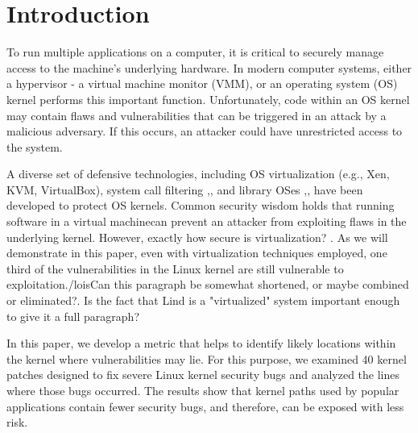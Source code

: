 \section{Introduction}
\label{sec.introduction}

To run multiple applications on a computer, it is critical to securely
manage access to the machine's underlying hardware. In modern computer systems,
either a hypervisor - a virtual machine monitor (VMM), or an
operating system (OS) kernel performs this important function. Unfortunately,
code within an OS kernel may contain flaws and vulnerabilities that can be
triggered in an attack by a malicious adversary. If this occurs, an attacker
could have unrestricted access to the system.


A diverse set of defensive technologies, including OS virtualization (e.g., Xen,
 KVM, VirtualBox), system call filtering \cite{Janus:99},\cite{SCI-04},
and library OSes \cite{Bascule},\cite{Drawbridge-11}, have been developed to
protect OS kernels. Common security wisdom holds that running software in a
virtual machinecan prevent an attacker from exploiting flaws in the underlying
kernel.
However, exactly how secure is virtualization? \cite{Tal}. As we will
demonstrate in this paper, even with virtualization techniques employed, one
third of the vulnerabilities in the Linux kernel are still vulnerable to exploitation./lois{Can this paragraph be somewhat shortened, or maybe combined or eliminated?. Is the fact that Lind is a "virtualized" system important
enough to give it a full paragraph?}

 In this paper, we develop a
metric that helps to identify likely locations within the kernel
where vulnerabilities may lie.
For this purpose, we examined 40 kernel patches designed to fix severe Linux
kernel security bugs and analyzed the lines where those bugs occurred.
The results show that kernel paths used by popular applications contain fewer
security bugs, and therefore, can be exposed with less risk.

